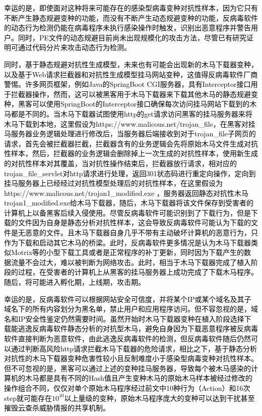 \textcolor{black}{幸运的是，即使面对这种将来可能存在的感染型病毒变种对抗性样本，因为它只有不断产生静态规避变种的功能，而没有不断产生动态规避变种的功能，反病毒软件的动态行为检测仍能在病毒程序未执行感染操作时触发，识别出恶意程序并警告用户。同时，PE文件的动态规避目前尚未出现规模化的攻击方法，尽管已有研究证明可通过代码分片来攻击动态行为检测\cite{ref38}\cite{ref39}\cite{ref40}。}

\textcolor{black}{同时，基于静态规避对抗性生成模型，未来也有可能会出现新的木马下载器变种，以及基于Web请求拦截器和对抗性生成模型挂马网站变种，这值得反病毒软件厂商警惕。许多网页框架，例如Java的SpringBoot CGI服务器，具有Interceptor接口用于拦截器操作，然而，这可以被黑客用于木马下载器来下载其他木马的静态规避变种，黑客可以使用SpringBoot的Interceptor接口确保每次访问挂马网站下载到的木马都是不同的。当木马下载器试图使用http的get请求访问黑客的挂马服务器来将木马下载到本地，这里假设为https://www.malicous.net/trojan\_file，在黑客对挂马服务器业务逻辑处理进行修改后，当服务器后端接收到对于trojan\_file子网页的请求，首先会被拦截器拦截，拦截器含有的业务逻辑会先将原始木马文件生成对抗性样本，然后，拦截器的业务逻辑会删除掉上一次生成的对抗性样本，使用新生成的对抗性样本对其覆盖，当对抗性操作结束后，拦截器放行请求，相对应的trojan\_file\_servlet对http请求进行处理，返回301状态码进行重定向操作，定向到挂马服务器上已经经过对抗性模型处理后的对抗性样本，在这里假设为https://www.malicous.net/trojan1\_modified.exe ，服务器返回静态对抗性木马trojan1\_modified.exe给木马下载器，随后，木马下载器将该文件保存到受害者的计算机上以备黑客后续入侵使用。尽管反病毒软件可能识别到了下载行为，但是下载的文件因为自身是静态分析对抗性样本，这会导致反病毒软件可能认为下载的文件是无恶意的文件。且木马下载器自身几乎不带有主动破坏计算机的恶意行为，只作为下载和启动其它木马的桥梁。此时，反病毒软件更多情况是认为木马下载器类似Motrix等的小型下载工具或者是正常程序的补丁更新，同时因为下载产生的数据流量不会过大，难以被判断为网络攻击。此时，相当于木马下载器完成了植入阶段的过程，在受害者的计算机上从黑客的挂马服务器上成功完成了下载木马程序。随后，将可能进入孵化期，上线期，攻击期\cite{ref41}。}

\textcolor{black}{幸运的是，反病毒软件可以根据网站安全可信度，并将某个IP或某个域名及其子域名下的所有内容划分为黑名单，禁止用户和应用程序访问。但不容忽视的是，域名和IP安全性鉴定仍然需要时间。虽然开始时木马下载器变种在植入阶段选择下载能逃逸反病毒软件静态分析的对抗型木马，避免自身因为下载恶意程序被反病毒软件直接判断为恶意软件，由此逃逸反病毒软件的检测，但反病毒软件随后仍然可以通过判断高风险http请求拦截木马下载器的危险请求，相比之下，基于静态分析对抗性的木马下载器变种危害性较小且反制难度小于感染型病毒变种对抗性样本。但不可忽视的是，黑客可以通过上述的变种挂马服务器，导致每个被木马感染的计算机的木马都是具有不同的Hash值且产生变种木马的原始木马样本被经过修改的操作组合不同，仅仅对单个原始木马程序经过前文中10种行为（Action）和16次step就可能存在$10^{10}$以上量级的变种，原始木马程序庞大的变种可以达到干扰甚至摧毁云查杀威胁情报的共享机制。}


